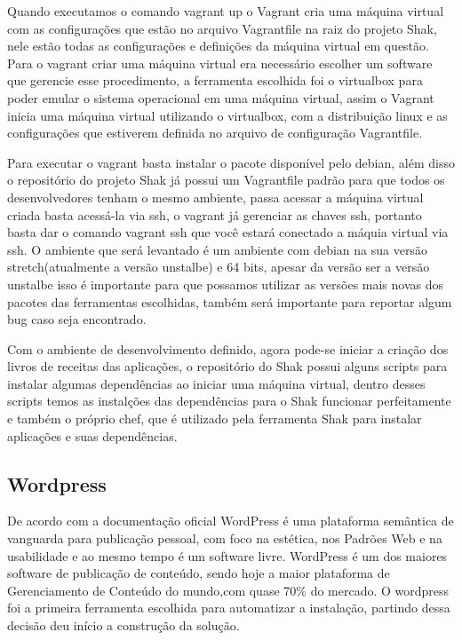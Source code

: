 Quando executamos o comando vagrant up o Vagrant cria uma máquina virtual com as
configurações que estão no arquivo Vagrantfile na raiz do projeto Shak, nele
estão todas as configurações e definições da máquina virtual em questão. Para o
vagrant criar uma máquina virtual era necessário escolher um software que gerencie
esse procedimento, a ferramenta escolhida foi o virtualbox para poder emular o sistema
operacional em uma máquina virtual, assim o  Vagrant inicia uma máquina virtual
utilizando o virtualbox, com a distribuição linux e as configurações que estiverem
definida no arquivo de configuração Vagrantfile.

Para executar o vagrant basta instalar o pacote disponível pelo debian, além disso
o repositório do projeto Shak já possui um Vagrantfile padrão para que todos os
desenvolvedores tenham o mesmo ambiente, passa acessar a máquina virtual criada
basta acessá-la via ssh, o vagrant já gerenciar as chaves ssh, portanto basta
dar o comando vagrant ssh que você estará conectado a máquia virtual via ssh.
O ambiente que será levantado é um ambiente com debian na sua versão
stretch(atualmente a versão unstalbe) e 64 bits, apesar da versão ser a versão
unstalbe isso é importante para que possamos utilizar as versões mais novas dos
 pacotes das ferramentas escolhidas, também será importante para reportar algum
 bug caso seja encontrado.

 Com o ambiente de desenvolvimento definido, agora pode-se iniciar a criação dos
 livros de receitas das aplicações, o repositório do Shak possui alguns scripts
 para instalar algumas dependências ao iniciar uma máquina virtual, dentro
 desses scripts temos as instalções das dependências para o Shak funcionar perfeitamente
 e também o próprio chef, que é utilizado pela ferramenta Shak para instalar aplicações e suas dependências.

\subsection{Wordpress}
\label{sub:wordpress}

De acordo com a documentação oficial\cite{wordpress} WordPress é uma plataforma
semântica de vanguarda para publicação pessoal, com foco na estética, nos
Padrões Web e na usabilidade e ao mesmo tempo é um software livre. WordPress é
um dos maiores software de publicação de conteúdo, sendo hoje a maior
plataforma de Gerenciamento de Conteúdo do mundo,com quase 70\% do mercado. O
wordpress foi a primeira ferramenta escolhida para automatizar a instalação, partindo
dessa decisão deu início a construção da solução.

